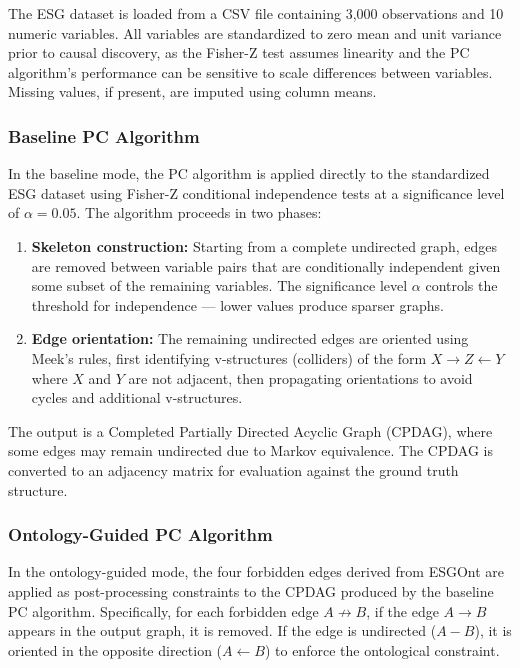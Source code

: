 \documentclass[a4paper,11pt,oneside]{article}
\begin{document}
The ESG dataset is loaded from a CSV file containing 3,000 observations and 10 numeric variables. All variables are standardized to zero mean and unit variance prior to causal discovery, as the Fisher-Z test assumes linearity and the PC algorithm's performance can be sensitive to scale differences between variables. Missing values, if present, are imputed using column means.

\subsubsection{Baseline PC Algorithm}

In the baseline mode, the PC algorithm is applied directly to the standardized ESG dataset using Fisher-Z conditional independence tests at a significance level of $\alpha = 0.05$. The algorithm proceeds in two phases:

\begin{enumerate}
    \item \textbf{Skeleton construction:} Starting from a complete undirected graph, edges are removed between variable pairs that are conditionally independent given some subset of the remaining variables. The significance level $\alpha$ controls the threshold for independence — lower values produce sparser graphs.

    \item \textbf{Edge orientation:} The remaining undirected edges are oriented using Meek's rules, first identifying v-structures (colliders) of the form $X \rightarrow Z \leftarrow Y$ where $X$ and $Y$ are not adjacent, then propagating orientations to avoid cycles and additional v-structures.
\end{enumerate}

The output is a Completed Partially Directed Acyclic Graph (CPDAG), where some edges may remain undirected due to Markov equivalence. The CPDAG is converted to an adjacency matrix for evaluation against the ground truth structure.

\subsubsection{Ontology-Guided PC Algorithm}

In the ontology-guided mode, the four forbidden edges derived from ESGOnt are applied as post-processing constraints to the CPDAG produced by the baseline PC algorithm. Specifically, for each forbidden edge $A \not\rightarrow B$, if the edge $A \rightarrow B$ appears in the output graph, it is removed. If the edge is undirected ($A - B$), it is oriented in the opposite direction ($A \leftarrow B$) to enforce the ontological constraint.
\end{document}
